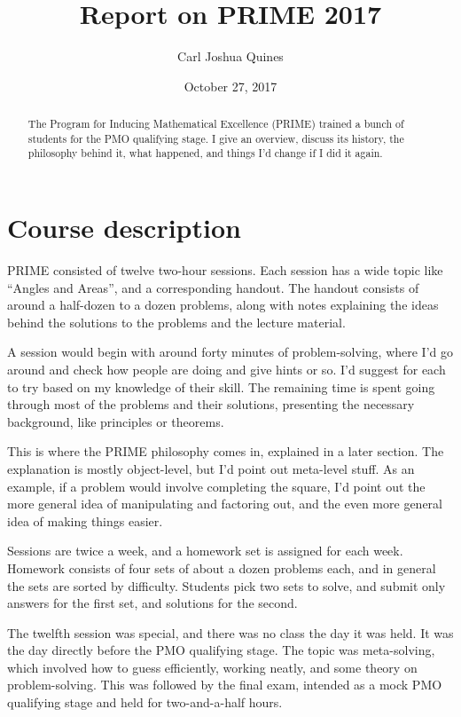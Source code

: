 \documentclass[11pt,paper=letter]{scrartcl}
\begin{document}
\title{Report on PRIME 2017}
\author{Carl Joshua Quines}
\date{October 27, 2017}

\maketitle

\begin{abstract}
  The Program for Inducing Mathematical Excellence (PRIME) trained a bunch of students for the PMO qualifying stage. I give an overview, discuss its history, the philosophy behind it, what happened, and things I'd change if I did it again.
\end{abstract}

\section{Course description}

PRIME consisted of twelve two-hour sessions. Each session has a wide topic like ``Angles and Areas'', and a corresponding handout. The handout consists of around a half-dozen to a dozen problems, along with notes explaining the ideas behind the solutions to the problems and the lecture material.

A session would begin with around forty minutes of problem-solving, where I'd go around and check how people are doing and give hints or so. I'd suggest for each to try based on my knowledge of their skill. The remaining time is spent going through most of the problems and their solutions, presenting the necessary background, like principles or theorems. 

This is where the PRIME philosophy comes in, explained in a later section. The explanation is mostly object-level, but I'd point out meta-level stuff. As an example, if a problem would involve completing the square, I'd point out the more general idea of manipulating and factoring out, and the even more general idea of making things easier. 

Sessions are twice a week, and a homework set is assigned for each week. Homework consists of four sets of about a dozen problems each, and in general the sets are sorted by difficulty. Students pick two sets to solve, and submit only answers for the first set, and solutions for the second. 

The twelfth session was special, and there was no class the day it was held. It was the day directly before the PMO qualifying stage. The topic was meta-solving, which involved how to guess efficiently, working neatly, and some theory on problem-solving. This was followed by the final exam, intended as a mock PMO qualifying stage and held for two-and-a-half hours. 
\end{document}
